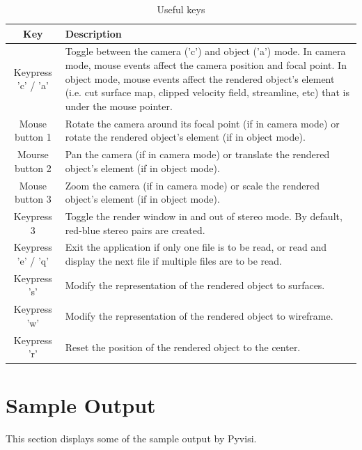 \begin{table}[ht]
\begin{center}
\begin{tabular}{| c | p{13cm} |}
\hline
\textbf{Key} & \textbf{Description} \\ \hline
Keypress 'c' / 'a' & Toggle between the camera ('c') and object ('a')  mode. In 
camera mode, mouse events affect the camera position and focal point. In 
object mode, mouse events affect the rendered object's element (i.e.
cut surface map, clipped velocity field, streamline, etc) that is under the 
mouse pointer.\\ \hline
Mouse button 1 & Rotate the camera around its focal point (if in camera mode) 
or rotate the rendered object's element (if in object mode).\\ \hline
Mourse button 2 & Pan the camera (if in camera mode) or translate the rendered 
object's element (if in object mode). \\ \hline
Mouse button 3 & Zoom the camera (if in camera mode) or scale the rendered 
object's element (if in object mode). \\ \hline
Keypress 3 & Toggle the render window in and out of stereo mode. By default,
red-blue stereo pairs are created. \\ \hline
Keypress 'e' / 'q' & Exit the application if only one file is to be read, or 
read and display the next file if multiple files are to be read. \\ \hline
Keypress 's' & Modify the representation of the rendered object to surfaces.
\\ \hline
Keypress 'w' & Modify the representation of the rendered object to wireframe.
\\ \hline
Keypress 'r' & Reset the position of the rendered object to the center.
\\ \hline
\end{tabular}
\caption{Useful keys}
\end{center}
\end{table}




\newpage

\section{Sample Output}
This section displays some of the sample output by Pyvisi.  

